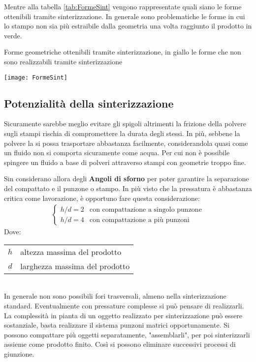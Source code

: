 Mentre alla tabella \ref{tab:FormeSint} vengono rappresentate quali siano le forme ottenibili tramite sinterizzazione.
In generale sono problematiche le forme in cui lo stampo non sia più estraibile dalla geometria una volta raggiunto il prodotto in verde.
\begin{table}
\centering
\caption{Forme geometriche ottenibili tramite sinterizzazione, in giallo le forme che non sono realizzabili tramite sinterizzazione}
\label{tab:FormeSint}
\texttt{[image: FormeSint]}
\end{table}

\subsection{Potenzialità della sinterizzazione}
Sicuramente sarebbe meglio evitare gli spigoli altrimenti la frizione della polvere sugli stampi rischia di compromettere la durata degli stessi.
In più, sebbene la polvere la si possa trasportare abbastanza facilmente, considerandola quasi come un fluido non si comporta sicuramente come acqua.
Per cui non è possibile spingere un fluido a base di polveri attraverso stampi con geometrie troppo fine.

Sin considerano allora degli \textbf{Angoli di sforno} per poter garantire la separazione del compattato e il punzone o stampo.
In più visto che la pressatura è abbastanza critica come lavorazione, è opportuno fare questa considerazione:
\begin{align}
\begin{cases}
h/d = 2 &\text{con compattazione a singolo punzone}\\
h/d = 4 &\text{con compattazione a più punzoni}
\end{cases}
\end{align}
Dove:\\
\begin{tabular}{cl}
$h$ & altezza massima del prodotto\\
$d$ & larghezza massima del prodotto
\end{tabular}\\

In generale non sono possibili fori trasversali, almeno nella sinterizzazione standard. Eventualmente con pressature complesse si può pensare di realizzarli.
La complessità in pianta di un oggetto realizzato per sinterizzazione può essere sostanziale, basta realizzare il sistema punzoni matrici opportunamente.
Si possono compattare più oggetti separatamente, "assemblarli", per poi sinterizzarli assieme come prodotto finito. 
Così si possono eliminare successivi processi di giunzione.

